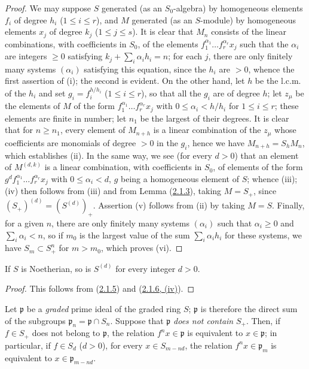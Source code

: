 \begin{proof}
We may suppose $S$ generated (as an $S_0$-algebra) by homogeneous
elements $f_i$ of degree $h_i$ ($1\leq i\leq r$), and $M$ generated (as
an $S$-module) by homogeneous elements $x_j$ of degree $k_j$
($1\leq j\leq s$). It is clear that $M_n$ consists of the linear
combinations, with coefficients in $S_0$, of the elements
$f_1^{\alpha_1}\ldots f_r^{\alpha_r}x_j$ such that the $\alpha_i$ are
integers $\geq 0$ satisfying $k_j+\sum_i\alpha_i h_i=n$; for each $j$,
there are only finitely many systems $(\alpha_i)$ satisfying this equation,
since the $h_i$ are $>0$, whence the first assertion of (i); the second
is evident. On the other hand, let $h$ be the l.c.m. of the $h_i$ and set
$g_i=f_i^{h/h_i}$ ($1\leq i\leq r$), so that all the $g_i$ are of
degree $h$; let $z_\mu$ be the elements of $M$ of the form
$f_1^{\alpha_1}\ldots f_r^{\alpha_r}x_j$ with
$0\leq\alpha_i<h/h_i$ for $1\leq i\leq r$; these elements are finite in
number; let $n_1$ be the largest of their degrees. It is clear that for
$n\geq n_1$, every element of $M_{n+h}$ is a linear combination of the
$z_\mu$ whose coefficients are monomials of degree $>0$ in the $g_i$,
hence we have $M_{n+h}=S_hM_n$, which establishes (ii). In the same way, we
see (for every $d>0$) that an element of $M^{(d,k)}$ is a linear
combination, with coefficients in $S_0$, of elements of the form
$g^df_1^{\alpha_1}\ldots f_r^{\alpha_r}x_j$ with
$0\leq\alpha_i<d$, $g$ being a homogeneous element of $S$; whence (iii); (iv)
then follows from (iii) and from Lemma (\hyperref[II.2.1.3]{2.1.3}),
taking $M=S_+$, since $(S_+)^{(d)}=(S^{(d)})_+$. Assertion (v)
follows from (ii) by taking $M=S$. Finally, for a given $n$, there are only
finitely many systems $(\alpha_i)$ such that $\alpha_i\geq 0$ and
$\sum_i\alpha_i<n$, so if $m_0$ is the largest value of the sum
$\sum_i\alpha_i h_i$ for these systems, we have $S_m\subset S_+^n$ for
$m>m_0$, which proves (vi).
\end{proof}

\begin{corollary}[2.1.7]
\label{II.2.1.7}
If $S$ is Noetherian, so is $S^{(d)}$ for every integer
$d>0$.
\end{corollary}

\begin{proof}
This follows from (\hyperref[II.2.1.5]{2.1.5}) and
(\hyperref[II.2.1.6]{2.1.6, (iv)}).
\end{proof}

\begin{env}[2.1.8]
\label{II.2.1.8}
Let $\mathfrak{p}$ be a \emph{graded} prime ideal of the graded ring $S$;
$\mathfrak{p}$ is therefore the direct sum of the subgroups
$\mathfrak{p}_n=\mathfrak{p}\cap S_n$. Suppose that $\mathfrak{p}$ \emph{does not
contain} $S_+$. Then, if $f\in S_+$ does not belong to
$\mathfrak{p}$, the relation $f^nx\in\mathfrak{p}$ is equivalent to
$x\in\mathfrak{p}$; in particular, if $f\in S_d$ ($d>0$), for every
$x\in S_{m-nd}$, the relation $f^nx\in\mathfrak{p}_m$ is equivalent to
$x\in\mathfrak{p}_{m-nd}$.
\end{env}

